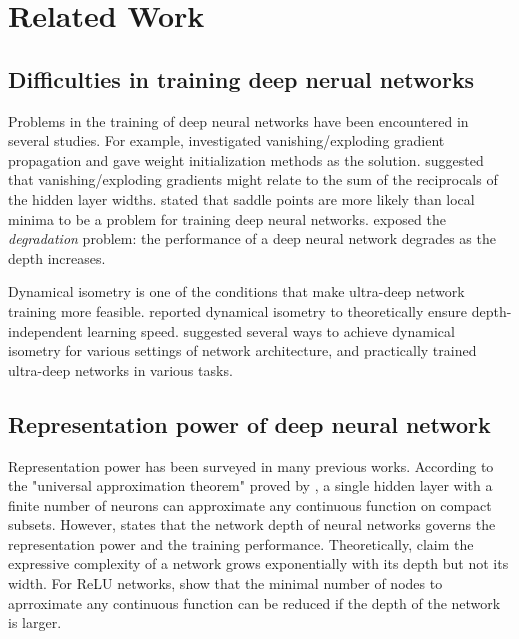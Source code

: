 \chapter{Related Work}
\label{related}

\section{Difficulties in training deep nerual networks}
\label{rel:difficulty}
Problems in the training of deep neural networks have been encountered in several studies.
For example, \cite{xavier, he} investigated vanishing/exploding gradient propagation and gave weight initialization methods as the solution. \cite{evop} suggested that vanishing/exploding gradients might relate to the sum of the reciprocals of the hidden layer widths.
\cite{opt_prob, saddle} stated that saddle points are more likely than local minima to be a problem for training deep neural networks.
\cite{degrade1, degrade2, resnet1} exposed the \textit{degradation} problem: the performance of a deep neural network degrades as the depth increases.

Dynamical isometry is one of the conditions that make ultra-deep network training more feasible.
\cite{mft:linear} reported dynamical isometry to theoretically ensure depth-independent learning speed.
\cite{mft:sigmoid, mft:spectral} suggested several ways to achieve dynamical isometry for various settings of network architecture, and \cite{mft:cnn, mft:rnn} practically trained ultra-deep networks in various tasks.

\section{Representation power of deep neural network}
\label{rel:representation}
Representation power has been surveyed in many previous works.
According to the "universal approximation theorem" proved by \cite{universal}, a single hidden layer
with a finite number of neurons can approximate any continuous function on compact subsets.
However, \cite{res_ensemble} states that the network depth of neural networks governs the 
representation power and the training performance.
Theoretically, \cite{mft:expo, expressive, linear_regions, expr_power} claim the expressive complexity
of a network grows exponentially with its depth but not its width.
For ReLU networks, \cite{relu_understand, relu_benifit, relu_approx} show that the minimal number of
nodes to aprroximate any continuous function can be reduced if the depth of the network is larger.

